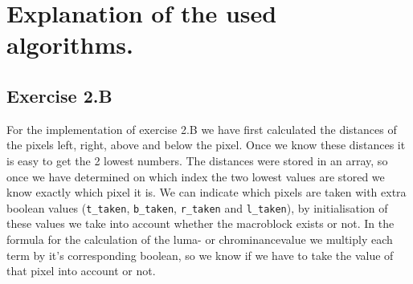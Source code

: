 \documentclass[a4paper,11pt,oneside]{article}
\begin{document}


\pagebreak


\section{Explanation of the used algorithms.}
\subsection*{Exercise 2.B}
For the implementation of exercise 2.B we have first calculated the distances of the pixels left, right, above and below the pixel. Once we know these distances it is easy to get the 2 lowest numbers. The distances were stored in an array, so once we have determined on which index the two lowest values are stored we know exactly which pixel it is. We can indicate which pixels are taken with extra boolean values (\verb!t_taken!, \verb!b_taken!, \verb!r_taken! and \verb!l_taken!), by initialisation of these values we take into account whether the macroblock exists or not. In the formula for the calculation of the luma- or chrominancevalue we multiply each term by it's corresponding boolean, so we know if we have to take the value of that pixel into account or not.
\end{document}
